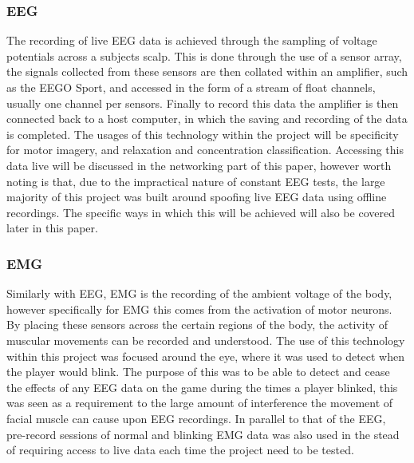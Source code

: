 \documentclass[11pt, a4paper]{article}
\begin{document}
\subsubsection{EEG}	
The recording of live EEG data is achieved through the sampling of voltage potentials across a subjects scalp. This is done through the use of a sensor array, the signals collected from these sensors are then collated within an amplifier, such as the EEGO Sport, and accessed in the form of a stream of float channels, usually one channel per sensors. Finally to record this data the amplifier is then connected back to a host computer, in which the saving and recording of the data is completed. The usages of this technology within the project will be specificity for motor imagery, and relaxation and concentration classification. Accessing this data live will be discussed in the networking part of this paper, however worth noting is that, due to the impractical nature of constant EEG tests, the large majority of this project was built around spoofing live EEG data using offline recordings. The specific ways in which this will be achieved will also be covered later in this paper.


\subsubsection{EMG}	
Similarly with EEG, EMG is the recording of the ambient voltage of the body, however specifically for EMG this comes from the activation of motor neurons. By placing these sensors across the certain regions of the body, the activity of muscular movements can be recorded and understood. The use of this technology within this project was focused around the eye, where it was used to detect when the player would blink. The purpose of this was to be able to detect and cease the effects of any EEG data on the game during the times a player blinked, this was seen as a requirement to the large amount of interference the movement of facial muscle can cause upon EEG recordings. In parallel to that of the EEG, pre-record sessions of normal and blinking EMG data was also used in the stead of requiring access to live data each time the project need to be tested. 
\end{document}
